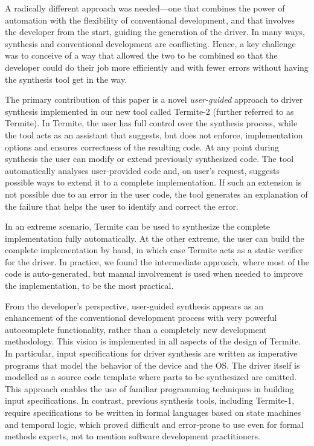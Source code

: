 \documentclass{book}
\newcommand{\termite}{Termite\xspace}
\theoremstyle{definition}
\begin{document}
A radically different approach was needed---one that combines the power of automation with the flexibility of conventional development, and that involves the developer from the start, guiding the generation of the driver.  In many ways, synthesis and conventional development are conflicting.  Hence, a key challenge was to conceive of a way that allowed the two to be combined so that the developer could do their job more efficiently and with fewer errors without having the synthesis tool get in the way.

The primary contribution of this paper is a novel \emph{user-guided} approach to driver synthesis implemented in our new tool called \termite-2 (further referred to as \termite).  In \termite, the user has full control over the synthesis process, while the tool acts as an assistant that suggests, but does not enforce, implementation options and ensures correctness of the resulting code.  At any point during synthesis the user can modify or extend previously synthesized code.  The tool automatically analyses user-provided code and, on user's request, suggests possible ways to extend it to a complete implementation.  If such an extension is not possible due to an error in the user code, the tool generates an explanation of the failure that helps the user to identify and correct the error.

In an extreme scenario, \termite can be used to synthesize the complete implementation fully automatically.  At the other extreme, the user can build the complete implementation by hand, in which case \termite acts as a static verifier for the driver.  In practice, we found the intermediate approach, where most of the code is auto-generated, but manual involvement is used when needed to improve the implementation, to be the most practical.

From the developer's perspective, user-guided synthesis appears as an enhancement of the conventional development process with very powerful autocomplete functionality, rather than a completely new development methodology.  This vision is implemented in all aspects of the design of \termite.  In particular, input specifications for driver synthesis are written as imperative programs that model the behavior of the device and the OS.  The driver itself is modelled as a source code template where parts to be synthesized are omitted.  This approach enables the use of familiar programming techniques in building input specifications.  In contrast, previous synthesis tools, including Termite-1, require specifications to be written in formal languages based on state machines and temporal logic, which proved difficult and error-prone to use even for formal methods experts, not to mention software development practitioners.
\end{document}

